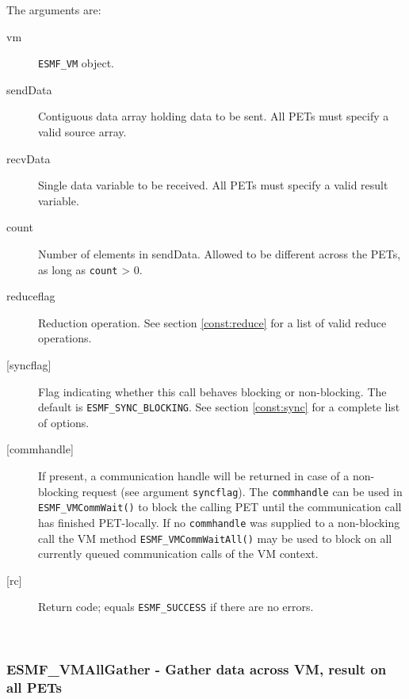      The arguments are:
     \begin{description}
     \item[vm] 
          {\tt ESMF\_VM} object.
     \item[sendData]
          Contiguous data array holding data to be sent. All PETs must specify a
          valid source array.
     \item[recvData] 
          Single data variable to be received. All PETs must specify a
          valid result variable.
     \item[count] 
          Number of elements in sendData. Allowed to be different across the 
          PETs, as long as {\tt count} > 0.
     \item[reduceflag] 
          Reduction operation. See section \ref{const:reduce} for a list of 
          valid reduce operations.
     \item[{[syncflag]}]
          Flag indicating whether this call behaves blocking or non-blocking.
          The default is {\tt ESMF\_SYNC\_BLOCKING}. See section
          \ref{const:sync} for a complete list of options.
     \item[{[commhandle]}]
          If present, a communication handle will be returned in case of a 
          non-blocking request (see argument {\tt syncflag}). The
          {\tt commhandle} can be used in {\tt ESMF\_VMCommWait()} to block the
          calling PET until the communication call has finished PET-locally. If
          no {\tt commhandle} was supplied to a non-blocking call the VM method
          {\tt ESMF\_VMCommWaitAll()} may be used to block on all currently queued
          communication calls of the VM context.
     \item[{[rc]}] 
          Return code; equals {\tt ESMF\_SUCCESS} if there are no errors.
     \end{description}
   
 
\mbox{}\hrulefill\ 
 
\subsubsection [ESMF\_VMAllGather] {ESMF\_VMAllGather - Gather data across VM, result on all PETs}



